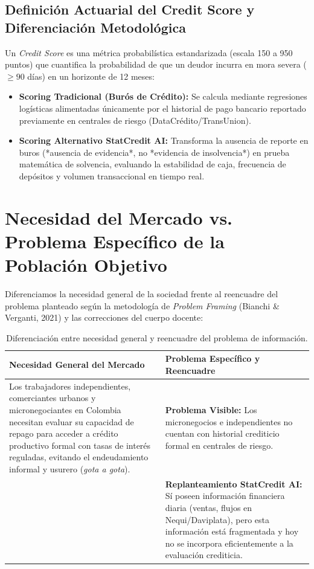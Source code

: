 \documentclass[11pt,a4paper]{article}
\begin{document}
\subsection{Definición Actuarial del Credit Score y Diferenciación Metodológica}
Un \textit{Credit Score} es una métrica probabilística estandarizada (escala 150 a 950 puntos) que cuantifica la probabilidad de que un deudor incurra en mora severa ($\ge 90$ días) en un horizonte de 12 meses:
\begin{itemize}[leftmargin=*]
    \item \textbf{Scoring Tradicional (Burós de Crédito):} Se calcula mediante regresiones logísticas alimentadas únicamente por el historial de pago bancario reportado previamente en centrales de riesgo (DataCrédito/TransUnion).
    \item \textbf{Scoring Alternativo StatCredit AI:} Transforma la ausencia de reporte en buros (*ausencia de evidencia*, no *evidencia de insolvencia*) en prueba matemática de solvencia, evaluando la estabilidad de caja, frecuencia de depósitos y volumen transaccional en tiempo real.
\end{itemize}

\section{Necesidad del Mercado vs. Problema Específico de la Población Objetivo}

Diferenciamos la necesidad general de la sociedad frente al reencuadre del problema planteado según la metodología de \textit{Problem Framing} (Bianchi \& Verganti, 2021) y las correcciones del cuerpo docente:

\begin{table}[h!]
\centering
\small
\begin{tabular}{p{7.5cm} p{7.5cm}}
\toprule
\textbf{Necesidad General del Mercado} & \textbf{Problema Específico y Reencuadre} \\
\midrule
Los trabajadores independientes, comerciantes urbanos y micronegociantes en Colombia necesitan evaluar su capacidad de repago para acceder a crédito productivo formal con tasas de interés reguladas, evitando el endeudamiento informal y usurero (\textit{gota a gota}). & \textbf{Problema Visible:} Los micronegocios e independientes no cuentan con historial crediticio formal en centrales de riesgo.\\
& \textbf{Replanteamiento StatCredit AI:} Sí poseen información financiera diaria (ventas, flujos en Nequi/Daviplata), pero esta información está fragmentada y hoy no se incorpora eficientemente a la evaluación crediticia. \\
\bottomrule
\end{tabular}
\caption{Diferenciación entre necesidad general y reencuadre del problema de información.}
\end{table}
\end{document}
